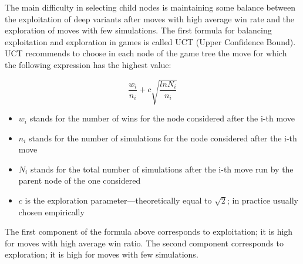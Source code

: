 \documentclass{article}
\begin{document}
\bigskip

\noindent The main difficulty in selecting child nodes is maintaining some balance between the exploitation of deep variants after moves with high average win rate and the exploration of moves with few simulations. The first formula for balancing exploitation and exploration in games is called UCT (Upper Confidence Bound). UCT recommends to choose in each node of the game tree the move for which the following expression has the highest value:

\[\frac{w_{i}}{n_{i}} + c \sqrt{\frac{ln N_{i}}{n_i}}\]

\begin{itemize}
    \item \(w_{i}\) stands for the number of wins for the node considered after the i-th move
    \item \(n_{i}\) stands for the number of simulations for the node considered after the i-th move
    \item \(N_{i}\) stands for the total number of simulations after the i-th move run by the parent node of the one considered
    \item \(c\) is the exploration parameter—theoretically equal to \(\sqrt{2}\); in practice usually chosen empirically
\end{itemize}

\noindent The first component of the formula above corresponds to exploitation; it is high for moves with high average win ratio. The second component corresponds to exploration; it is high for moves with few simulations.

\printindex
\end{document}
